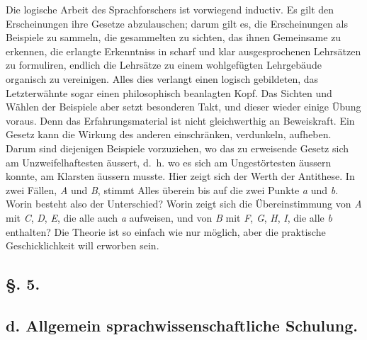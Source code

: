 \label{fp.49}

Die logische Arbeit des Sprachforschers ist vorwiegend inductiv. Es gilt den Erscheinungen ihre Gesetze abzulauschen; darum gilt es, die Erscheinungen als Beispiele zu sammeln, die gesammelten zu sichten, das ihnen Gemeinsame zu erkennen, die erlangte Erkenntniss in scharf und klar ausgesprochenen Lehrsätzen zu formuliren, endlich die Lehrsätze zu einem wohlgefügten Lehrgebäude organisch zu vereinigen. Alles dies verlangt einen logisch gebildeten, das Letzterwähnte sogar einen philosophisch beanlagten Kopf. Das Sichten und Wählen der Beispiele aber setzt besonderen Takt, und dieser wieder einige Übung voraus. Denn das Erfahrungsmaterial ist nicht gleichwerthig an Beweiskraft. Ein Gesetz kann die Wirkung des anderen einschränken, verdunkeln, aufheben. Darum sind diejenigen Beispiele vorzuziehen, wo das zu erweisende Gesetz sich am Unzweifelhaftesten äussert, d.~h. wo es sich am Ungestörtesten äussern konnte, am Klarsten äussern musste. Hier zeigt sich der Werth der Antithese. In zwei Fällen, \textit{A} und \textit{B}, stimmt Alles überein bis auf die zwei Punkte \textit{a} und \textit{b}. Worin besteht also der Unterschied? Worin zeigt sich die Übereinstimmung von \textit{A} mit \textit{C}, \textit{D}, \textit{E}, die alle auch \textit{a} aufweisen, und von \textit{B} mit \textit{F}, \textit{G}, \textit{H}, \textit{I}, die alle \textit{b} enthalten? Die Theorie ist so einfach wie nur möglich, aber die praktische Geschicklichkeit will erworben sein.

\subsection*{§. 5.}\label{I.V.5}
\subsection*{d. Allgemein sprachwissenschaftliche Schulung.}

